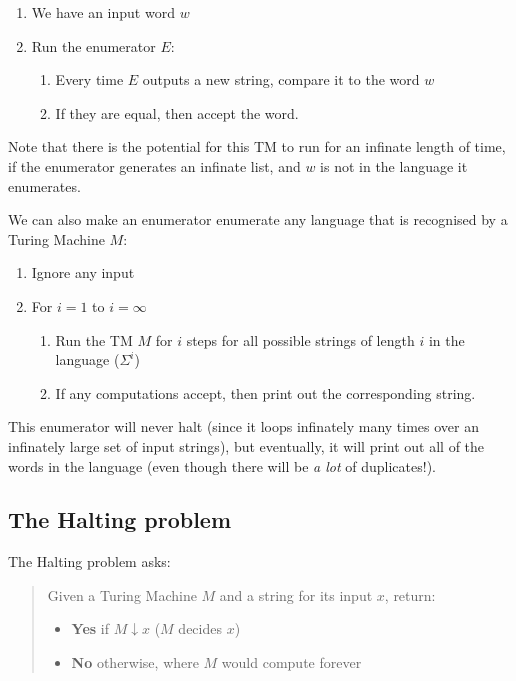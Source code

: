 \begin{enumerate}
  \item We have an input word $w$
  \item Run the enumerator $E$:
  \begin{enumerate}
    \item Every time $E$ outputs a new string, compare it to the word $w$
    \item If they are equal, then accept the word.
  \end{enumerate}
\end{enumerate}

Note that there is the potential for this TM to run for an infinate length of
time, if the enumerator generates an infinate list, and $w$ is not in the
language it enumerates.

We can also make an enumerator enumerate any language that is recognised by a
Turing Machine $M$:

\begin{enumerate}
  \item Ignore any input
  \item For $i = 1$ to $i = \infty$
  \begin{enumerate}
    \item Run the TM $M$ for $i$ steps for all possible strings of length $i$ in
      the language ($\Sigma^i$)
    \item If any computations accept, then print out the corresponding string.
  \end{enumerate}
\end{enumerate}

This enumerator will never halt (since it loops infinately many times over an
infinately large set of input strings), but eventually, it will print out all of
the words in the language (even though there will be \textit{a lot} of
duplicates!).

\subsection{The Halting problem}

The Halting problem asks:

\begin{quote}
  Given a Turing Machine $M$ and a string for its input $x$, return:
  \begin{itemize}
    \item[] \textbf{Yes} if $M \downarrow x$ ($M$ decides $x$)
    \item[] \textbf{No} otherwise, where $M$ would compute forever
  \end{itemize}
\end{quote}


